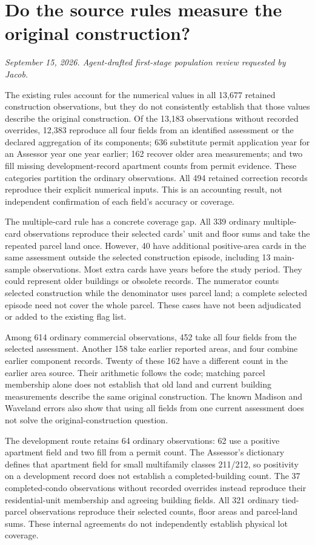 \clearpage
\section*{Do the source rules measure the original construction?}
\textit{September 15, 2026. Agent-drafted first-stage population review requested by Jacob.}

The existing rules account for the numerical values in all 13,677
retained construction observations, but they do not consistently
establish that those values describe the original construction. Of the
13,183 observations without recorded overrides, 12,383 reproduce all
four fields from an identified assessment or the declared aggregation of
its components; 636 substitute permit application year for an Assessor
year one year earlier; 162 recover older area measurements; and two fill
missing development-record apartment counts from permit evidence. These
categories partition the ordinary observations. All 494 retained
correction records reproduce their explicit numerical inputs. This is
an accounting result, not independent confirmation of each field's
accuracy or coverage.

The multiple-card rule has a concrete coverage gap. All 339 ordinary
multiple-card observations reproduce their selected cards' unit and
floor sums and take the repeated parcel land once. However, 40 have
additional positive-area cards in the same assessment outside the
selected construction episode, including 13 main-sample observations.
Most extra cards have years before the study period. They could
represent older buildings or obsolete records. The numerator counts
selected construction while the denominator uses parcel land; a
complete selected episode need not cover the whole parcel. These cases
have not been adjudicated or added to the existing flag list.

Among 614 ordinary commercial observations, 452 take all four fields
from the selected assessment. Another 158 take earlier reported areas,
and four combine earlier component records. Twenty of these 162 have a
different count in the earlier area source. Their arithmetic follows
the code; matching parcel membership alone does not establish that old
land and current building measurements describe the same original
construction. The known Madison and Waveland errors also show that
using all fields from one current assessment does not solve the
original-construction question.

The development route retains 64 ordinary observations: 62 use a
positive apartment field and two fill from a permit count. The
Assessor's dictionary defines that apartment field for small multifamily
classes 211/212, so positivity on a development record does not establish
a completed-building count. The 37 completed-condo observations without
recorded overrides instead reproduce their residential-unit membership
and agreeing building fields. All 321 ordinary tied-parcel observations
reproduce their selected counts, floor areas and parcel-land sums.
These internal agreements do not independently establish physical lot
coverage.


